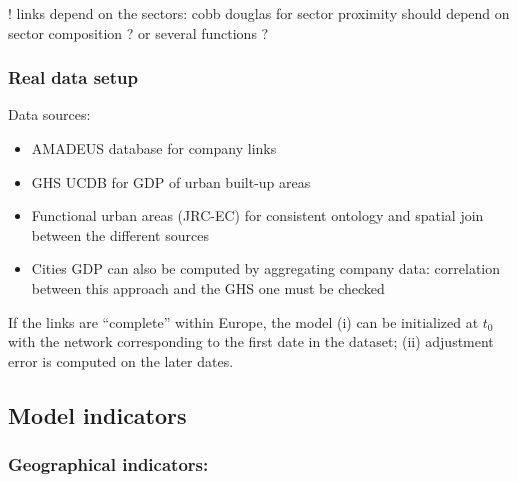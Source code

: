 \documentclass{article}
\begin{document}
! links depend on the sectors: cobb douglas for sector proximity should depend on sector composition ? or several functions ?


\subsubsection{Real data setup}

Data sources:
\begin{itemize}
	\item AMADEUS database for company links
	\item GHS UCDB for GDP of urban built-up areas
	\item Functional urban areas (JRC-EC) for consistent ontology and spatial join between the different sources
	\item Cities GDP can also be computed by aggregating company data: correlation between this approach and the GHS one must be checked
\end{itemize}

If the links are ``complete'' within Europe, the model (i) can be initialized at $t_0$ with the network corresponding to the first date in the dataset; (ii) adjustment error is computed on the later dates.





\subsection{Model indicators}


\subsubsection{Geographical indicators:}
\end{document}
